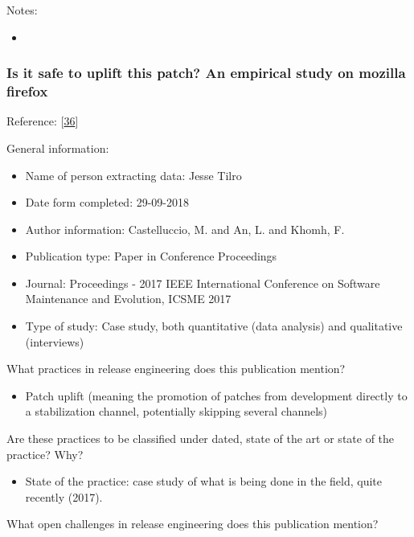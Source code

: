 \documentclass[]{book}
\providecommand{\tightlist}{%
  \setlength{\itemsep}{0pt}\setlength{\parskip}{0pt}}
\begin{document}
Notes:

\begin{itemize}
\item
\end{itemize}

\subsubsection{Is it safe to uplift this patch? An empirical study on
mozilla
firefox}\label{is-it-safe-to-uplift-this-patch-an-empirical-study-on-mozilla-firefox}

Reference: {[}\protect\hyperlink{ref-castelluccio2017a}{36}{]}

General information:

\begin{itemize}
\tightlist
\item
  Name of person extracting data: Jesse Tilro
\item
  Date form completed: 29-09-2018
\item
  Author information: Castelluccio, M. and An, L. and Khomh, F.
\item
  Publication type: Paper in Conference Proceedings
\item
  Journal: Proceedings - 2017 IEEE International Conference on Software
  Maintenance and Evolution, ICSME 2017
\item
  Type of study: Case study, both quantitative (data analysis) and
  qualitative (interviews)
\end{itemize}

What practices in release engineering does this publication mention?

\begin{itemize}
\tightlist
\item
  Patch uplift (meaning the promotion of patches from development
  directly to a stabilization channel, potentially skipping several
  channels)
\end{itemize}

Are these practices to be classified under dated, state of the art or
state of the practice? Why?

\begin{itemize}
\tightlist
\item
  State of the practice: case study of what is being done in the field,
  quite recently (2017).
\end{itemize}

What open challenges in release engineering does this publication
mention?
\end{document}

